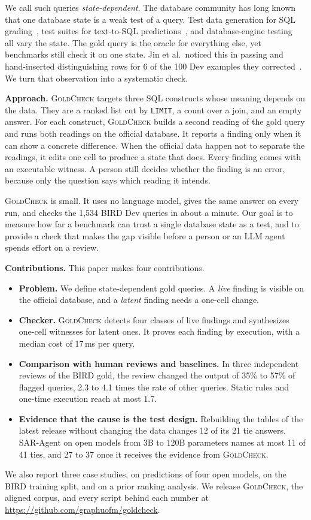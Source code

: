 \documentclass[conference]{IEEEtran}
\newcommand{\sys}{\textsc{GoldCheck}}
\begin{document}
We call such queries \emph{state-dependent}. The database community has long
known that one database state is a weak test of a query. Test data generation
for SQL grading~\cite{chandra2015xdata}, test suites for text-to-SQL
predictions~\cite{zhong2020test}, and database-engine
testing~\cite{rigger2020pqs,rigger2020tlp} all vary the state. The gold query is
the oracle for everything else, yet benchmarks still check it on one state. Jin
et al.\ noticed this in passing and hand-inserted distinguishing rows for 6 of
the 100 Dev examples they corrected~\cite{jin2026pervasive}. We turn that
observation into a systematic check.

\textbf{Approach.} \sys{} targets three SQL constructs whose meaning depends on
the data. They are a ranked list cut by \texttt{LIMIT}, a count over a join, and
an empty answer. For each construct, \sys{} builds a second reading of the gold
query and runs both readings on the official database. It reports a finding only
when it can show a concrete difference. When the official data happen not to
separate the readings, it edits one cell to produce a state that does. Every
finding comes with an executable witness. A person still decides whether the
finding is an error, because only the question says which reading it intends.

\sys{} is small. It uses no language model, gives the same answer on every run,
and checks the 1,534 BIRD Dev queries in about a minute. Our goal is to measure
how far a benchmark can trust a single database state as a test, and to provide
a check that makes the gap visible before a person or an LLM agent spends effort
on a review.

\textbf{Contributions.} This paper makes four contributions.
\begin{itemize}
\item[(1)] \textbf{Problem.} We define state-dependent gold queries. A
\emph{live} finding is visible on the official database, and a \emph{latent}
finding needs a one-cell change.
\item[(2)] \textbf{Checker.} \sys{} detects four classes of live findings and
synthesizes one-cell witnesses for latent ones. It proves each finding by
execution, with a median cost of 17\,ms per query.
\item[(3)] \textbf{Comparison with human reviews and baselines.} In three
independent reviews of the BIRD gold, the review changed the output of 35\% to
57\% of flagged queries, 2.3 to 4.1 times the rate of other queries. Static
rules and one-time execution reach at most 1.7.
\item[(4)] \textbf{Evidence that the cause is the test design.} Rebuilding the
tables of the latest release without changing the data changes 12 of its 21 tie
answers. SAR-Agent on open models from 3B to 120B parameters names at most 11 of
41 ties, and 27 to 37 once it receives the evidence from \sys{}.
\end{itemize}
We also report three case studies, on predictions of four open models, on the
BIRD training split, and on a prior ranking analysis. We release \sys{}, the
aligned corpus, and every script behind each number at
\url{https://github.com/graphuofm/goldcheck}.
\end{document}
